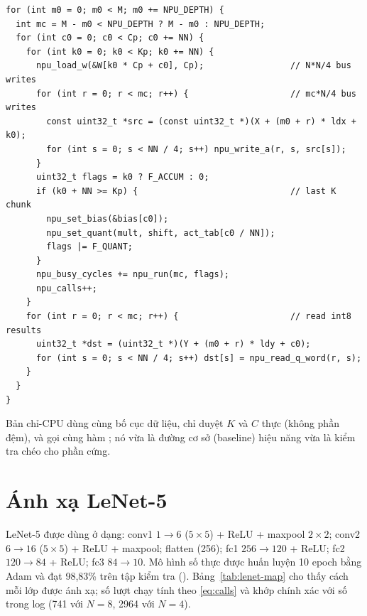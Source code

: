 \begin{lstlisting}[style=codec, caption={Vòng lặp chia khối của \code{npu\_matmul} (\code{fw/nn.h}, bỏ phần đo thời gian)}, label={lst:tiling}]
for (int m0 = 0; m0 < M; m0 += NPU_DEPTH) {
  int mc = M - m0 < NPU_DEPTH ? M - m0 : NPU_DEPTH;
  for (int c0 = 0; c0 < Cp; c0 += NN) {
    for (int k0 = 0; k0 < Kp; k0 += NN) {
      npu_load_w(&W[k0 * Cp + c0], Cp);                 // N*N/4 bus writes
      for (int r = 0; r < mc; r++) {                    // mc*N/4 bus writes
        const uint32_t *src = (const uint32_t *)(X + (m0 + r) * ldx + k0);
        for (int s = 0; s < NN / 4; s++) npu_write_a(r, s, src[s]);
      }
      uint32_t flags = k0 ? F_ACCUM : 0;
      if (k0 + NN >= Kp) {                              // last K chunk
        npu_set_bias(&bias[c0]);
        npu_set_quant(mult, shift, act_tab[c0 / NN]);
        flags |= F_QUANT;
      }
      npu_busy_cycles += npu_run(mc, flags);
      npu_calls++;
    }
    for (int r = 0; r < mc; r++) {                      // read int8 results
      uint32_t *dst = (uint32_t *)(Y + (m0 + r) * ldy + c0);
      for (int s = 0; s < NN / 4; s++) dst[s] = npu_read_q_word(r, s);
    }
  }
}
\end{lstlisting}

Bản chỉ-CPU  dùng cùng bố cục dữ liệu, chỉ duyệt $K$ và $C$ thực (không phần đệm), và gọi cùng hàm ; nó vừa là đường cơ sở (baseline) hiệu năng vừa là kiểm tra chéo cho phần cứng.

\section{Ánh xạ LeNet-5}
\label{sec:lenet-map}
LeNet-5 \cite{lecun1998lenet} được dùng ở dạng: conv1 $1\to6$ ($5\times5$) + ReLU + maxpool $2\times2$; conv2 $6\to16$ ($5\times5$) + ReLU + maxpool; flatten (256); fc1 $256\to120$ + ReLU; fc2 $120\to84$ + ReLU; fc3 $84\to10$. Mô hình số thực được huấn luyện 10 epoch bằng Adam và đạt 98,83\% trên tập kiểm tra (). Bảng~\ref{tab:lenet-map} cho thấy cách mỗi lớp được ánh xạ; số lượt chạy tính theo \eqref{eq:calls} và khớp chính xác với số  trong log (741 với $N=8$, \num{2964} với $N=4$).

